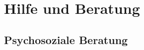 \documentclass[12pt, a4paper]{article}
\newif\ifinfo
\begin{document}
\newpage
\section{Hilfe und Beratung}
\ifinfo
	\subsection{Don't panic! -- Erste Hilfe: fsi}
	
\else
	
\fi

%	
%	

\ifinfo
	\subsection{Ansprechpartner nach Studiengängen}
	

	\subsection{Prüfungssekretariate}
	

	\subsection{Studierendensekretariat}
	
\fi
\subsection{Psychosoziale Beratung}





%

%
\end{document}
